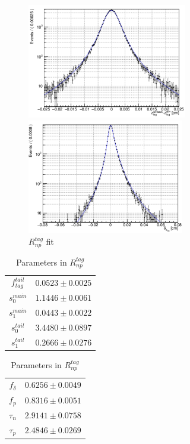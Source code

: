 \begin{figure}[H]
	\begin{minipage}[b]{0.5\linewidth}
		\centering
		\includegraphics[height=5cm]{figures/Rdet}
		\caption{$R_{det}^{tag} $ fit}
	\end{minipage}
	\begin{minipage}[b]{0.5\linewidth}
		\centering
		\includegraphics[height=5cm]{figures/Rnp}
		\caption{$R_{np}^{tag}$ fit}
	\end{minipage}
\end{figure}
\begin{table}[H]
	\begin{minipage}[b]{0.5\linewidth}
		\centering
		\caption{Parameters in $R^{tag}_{det}$}
		\begin{tabular}{|c|c|}
			\hline
			$f_{tag}^{tail}$ & $0.0523 \pm 0.0025$\\
			$s_0^{main}$&  $1.1446 \pm 0.0061$ \\
			$s_1^{main}$ & $0.0443\pm 0.0022$\\
			$s_0^{tail}$ &  $3.4480\pm 0.0897$\\
			$s_1^{tail}$  & $0.2666\pm0.0276$ \\
			\hline
		\end{tabular}
	\end{minipage}
	\begin{minipage}[b]{0.5\linewidth}
		\centering
		\caption{Parameters in $R^{tag}_{np}$}
		\begin{tabular}{|c|c|}
			\hline
			$f_{\delta}$ & $0.6256\pm 0.0049$\\
			$f_p$ &  $0.8316 \pm 0.0051$ \\
			$\tau_n$ & $2.9141\pm 0.0758$\\
			$\tau_p$ &  $2.4846\pm 0.0269$\\
			\hline
		\end{tabular}
	\end{minipage}
\end{table}


